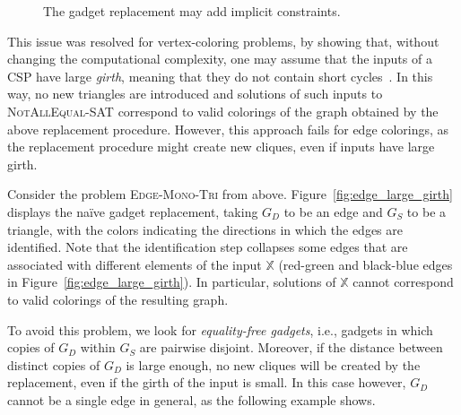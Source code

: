 \documentclass[oneside]{amsart}
\newcommand{\str}[1]{\mathbb{#1}}
\begin{document}
\begin{figure}
    \caption{The
    gadget replacement may add implicit constraints.}
    \label{fig:vertex_small_girth}
\end{figure}
This issue was resolved for vertex-coloring problems, by showing that, without changing the computational complexity, one may assume that the inputs of a CSP have large \emph{girth}, meaning that they do not contain short cycles~\cite{FederVardi,Kun}. In this way, no new triangles are introduced and solutions of such inputs to \textsc{NotAllEqual-SAT} correspond to valid colorings of the graph obtained by the above replacement procedure. 
However, this approach fails for edge colorings, as the replacement procedure might create new cliques, even if inputs have large girth.

\begin{exam}
    Consider the problem \textsc{Edge-Mono-Tri} from above.
    Figure~\ref{fig:edge_large_girth} displays the na\"ive gadget replacement, taking $G_D$ to be an edge and $G_S$ to be a triangle, with the colors indicating the directions in which the edges are identified.
    Note that the identification step collapses some edges that are associated with different elements of the input $\str X$ (red-green and black-blue edges in Figure~\ref{fig:edge_large_girth}). In particular, solutions of $\str X$ cannot correspond to valid colorings of the resulting graph.
\end{exam}

To avoid this problem, we look for \emph{equality-free gadgets}, i.e., gadgets in which copies of $G_D$ within $G_S$ are pairwise disjoint. Moreover, if the distance between distinct copies of $G_D$ is large enough, no new cliques will be created by the replacement, even if the girth of the input is small. 
In this case however, $G_D$ cannot be a single edge in general, as the following example shows.
\end{document}
